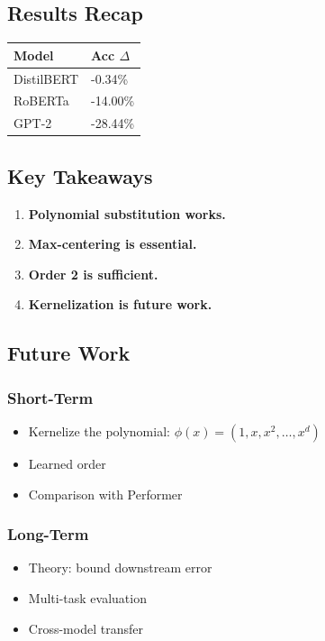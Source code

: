 \subsection{Results Recap}

\begin{table}[H]
\centering
\small
\begin{tabular}{ll}
\toprule
\textbf{Model} & \textbf{Acc $\Delta$} \\
\midrule
DistilBERT & -0.34\% \\
RoBERTa & -14.00\% \\
GPT-2 & -28.44\% \\
\bottomrule
\end{tabular}
\end{table}

\subsection{Key Takeaways}

\begin{enumerate}
\item \textbf{Polynomial substitution works.}
\item \textbf{Max-centering is essential.}
\item \textbf{Order 2 is sufficient.}
\item \textbf{Kernelization is future work.}

\end{enumerate}
\subsection{Future Work}

\subsubsection{Short-Term}
\begin{itemize}
\item Kernelize the polynomial: $\phi(x) = (1, x, x^2, \ldots, x^d)$
\item Learned order
\item Comparison with Performer

\end{itemize}
\subsubsection{Long-Term}
\begin{itemize}
\item Theory: bound downstream error
\item Multi-task evaluation
\item Cross-model transfer

\end{itemize}
